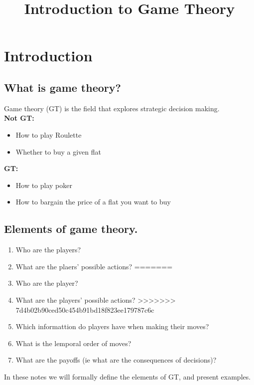 \documentclass{article}
\title{Introduction to Game Theory}
\date{}
\begin{document}
\maketitle

\section{Introduction}

\subsection{What is game theory?}
Game theory (GT) is the field that explores strategic decision making. \\

\textbf{Not GT:}
\begin{itemize}
    \item How to play Roulette
    \item Whether to buy a given flat
\end{itemize}

\textbf{GT:}
\begin{itemize}
    \item How to play poker
    \item How to bargain the price of a flat you want to buy
\end{itemize}

\subsection{Elements of game theory.}

\begin{enumerate}
<<<<<<< HEAD
    \item Who are the players?
    \item What are the plaers' possible actions?
=======
    \item Who are the player?
    \item What are the players' possible actions?
>>>>>>> 7d4b02b90ced50c454b91bd18f823ee179787c6c
    \item Which informattion do players have when making their moves?
    \item What is the lemporal order of moves?
    \item What are the payoffs (ie what are the consequences of decisions)?
\end{enumerate}

In these notes we will formally define the elements of GT, and present examples.
\end{document}
